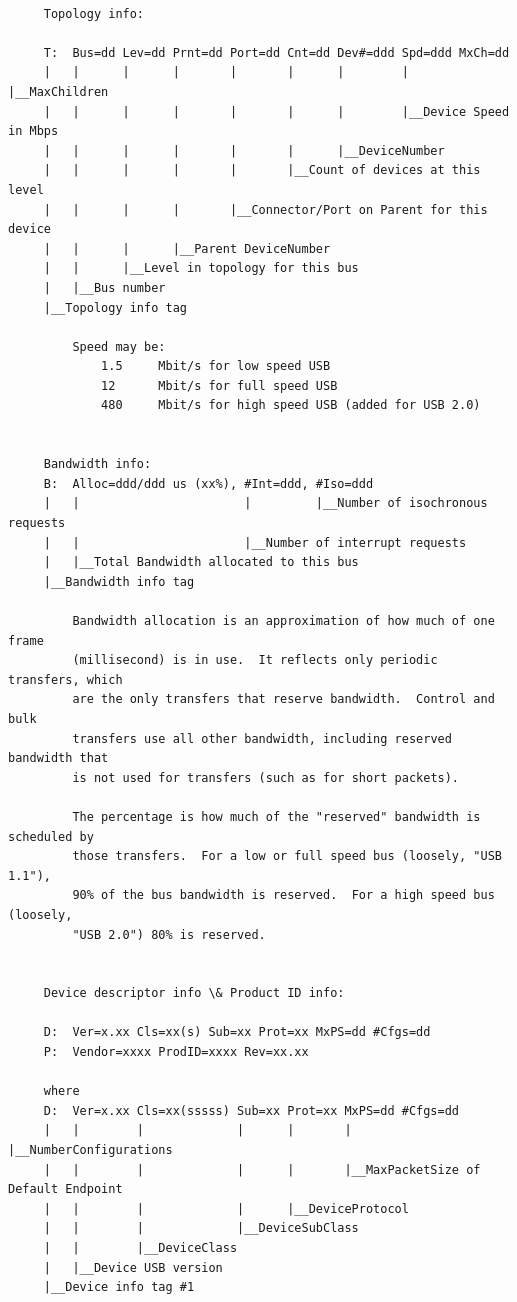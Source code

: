 {{{{{{{{{{{{{{{{{\begin{verbatim}
     
     Topology info:
     
     T:  Bus=dd Lev=dd Prnt=dd Port=dd Cnt=dd Dev#=ddd Spd=ddd MxCh=dd
     |   |      |      |       |       |      |        |       |__MaxChildren
     |   |      |      |       |       |      |        |__Device Speed in Mbps
     |   |      |      |       |       |      |__DeviceNumber
     |   |      |      |       |       |__Count of devices at this level
     |   |      |      |       |__Connector/Port on Parent for this device
     |   |      |      |__Parent DeviceNumber
     |   |      |__Level in topology for this bus
     |   |__Bus number
     |__Topology info tag
     
         Speed may be:
             1.5     Mbit/s for low speed USB
             12      Mbit/s for full speed USB
             480     Mbit/s for high speed USB (added for USB 2.0)
     
     
     Bandwidth info:
     B:  Alloc=ddd/ddd us (xx%), #Int=ddd, #Iso=ddd
     |   |                       |         |__Number of isochronous requests
     |   |                       |__Number of interrupt requests
     |   |__Total Bandwidth allocated to this bus
     |__Bandwidth info tag
     
         Bandwidth allocation is an approximation of how much of one frame
         (millisecond) is in use.  It reflects only periodic transfers, which
         are the only transfers that reserve bandwidth.  Control and bulk
         transfers use all other bandwidth, including reserved bandwidth that
         is not used for transfers (such as for short packets).
     
         The percentage is how much of the "reserved" bandwidth is scheduled by
         those transfers.  For a low or full speed bus (loosely, "USB 1.1"),
         90% of the bus bandwidth is reserved.  For a high speed bus (loosely,
         "USB 2.0") 80% is reserved.
     
     
     Device descriptor info \& Product ID info:
     
     D:  Ver=x.xx Cls=xx(s) Sub=xx Prot=xx MxPS=dd #Cfgs=dd
     P:  Vendor=xxxx ProdID=xxxx Rev=xx.xx
     
     where
     D:  Ver=x.xx Cls=xx(sssss) Sub=xx Prot=xx MxPS=dd #Cfgs=dd
     |   |        |             |      |       |       |__NumberConfigurations
     |   |        |             |      |       |__MaxPacketSize of Default Endpoint
     |   |        |             |      |__DeviceProtocol
     |   |        |             |__DeviceSubClass
     |   |        |__DeviceClass
     |   |__Device USB version
     |__Device info tag #1
     

\end{verbatim}}}}}}}}}}}}}}}}}}
